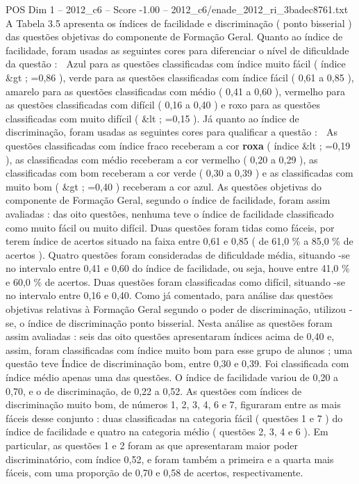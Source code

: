 \begin{textsample}{POS Dim 1 – 2012\_c6 – Score -1.00 – 2012\_c6/enade\_2012\_ri\_3badec8761.txt}
A Tabela 3.5 apresenta os índices de facilidade e discriminação ( ponto bisserial ) das questões objetivas do componente de Formação Geral.
Quanto ao índice de facilidade, foram usadas as seguintes cores para diferenciar o nível de dificuldade da questão :  Azul para as questões classificadas com índice muito fácil ( índice \&gt ; =0,86 ), verde para as questões classificadas com índice fácil ( 0,61 a 0,85 ), amarelo para as questões classificadas com médio ( 0,41 a 0,60 ), vermelho para as questões classificadas com difícil ( 0,16 a 0,40 ) e roxo para as questões classificadas com muito difícil ( \&lt ; =0,15 ).
Já quanto ao índice de discriminação, foram usadas as seguintes cores para qualificar a questão :  As questões classificadas com índice fraco receberam a cor \textbf{roxa} ( índice \&lt ; =0,19 ), as classificadas com médio receberam a cor vermelho ( 0,20 a 0,29 ), as classificadas com bom receberam a cor verde ( 0,30 a 0,39 ) e as classificadas com muito bom ( \&gt ; =0,40 ) receberam a cor azul.
As questões objetivas do componente de Formação Geral, segundo o índice de facilidade, foram assim avaliadas : das oito questões, nenhuma teve o índice de facilidade classificado como muito fácil ou muito difícil.
Duas questões foram tidas como fáceis, por terem índice de acertos situado na faixa entre 0,61 e 0,85 ( de 61,0 \% a 85,0 \% de acertos ).
Quatro questões foram consideradas de dificuldade média, situando -se no intervalo entre 0,41 e 0,60 do índice de facilidade, ou seja, houve entre 41,0 \% e 60,0 \% de acertos.
Duas questões foram classificadas como difícil, situando -se no intervalo entre 0,16 e 0,40.
Como já comentado, para análise das questões objetivas relativas à Formação Geral segundo o poder de discriminação, utilizou -se, o índice de discriminação ponto bisserial.
Nesta análise as questões foram assim avaliadas : seis das oito questões apresentaram índices acima de 0,40 e, assim, foram classificadas com índice muito bom para esse grupo de alunos ; uma questão teve Índice de discriminação bom, entre 0,30 e 0,39.
Foi classificada com índice médio apenas uma das questões.
O índice de facilidade variou de 0,20 a 0,70, e o de discriminação, de 0,22 a 0,52.
As questões com índices de discriminação muito bom, de números 1, 2, 3, 4, 6 e 7, figuraram entre as mais fáceis desse conjunto : duas classificadas na categoria fácil ( questões 1 e 7 ) do índice de facilidade e quatro na categoria médio ( questões 2, 3, 4 e 6 ).
Em particular, as questões 1 e 2 foram as que apresentaram maior poder discriminatório, com índice 0,52, e foram também a primeira e a quarta mais fáceis, com uma proporção de 0,70 e 0,58 de acertos, respectivamente.

\end{textsample}
